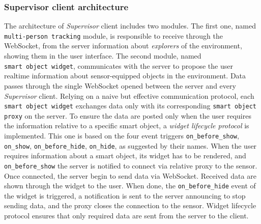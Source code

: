 \subsubsection{Supervisor client architecture}\label{supervisor-client-architecture}

The architecture of \emph{Supervisor} client includes two modules. The first
one, named \texttt{multi-person\ tracking} module, is responsible to
receive through the WebSocket, from the server information about
\emph{explorers} of the environment, showing them in the user interface. The
second module, named \texttt{smart\ object\ widget}, communicates with the
server to propose the user realtime information about sensor-equip\-ped
objects in the environment. Data passes through the single WebSocket
opened between the server and every \emph{Supervisor} client. Relying on a
naive but effective communication protocol, each \texttt{smart object widget}
exchanges data only with its corresponding \texttt{smart object proxy} on the server. To
ensure the data are posted only when the user requires the information
relative to a specific smart object, a \emph{widget lifecycle protocol} is
implemented. This one is based on the four event triggers \texttt{on\_before\_show},
\texttt{on\_show}, \texttt{on\_before\_hide}, \texttt{on\_hide}, as suggested by their names.
When the user requires information about a smart object, its widget has
to be rendered, and \texttt{on\_before\_show} the server is notified to
connect via relative proxy to the sensor. Once connected, the server
begin to send data via WebSocket. Received data are shown through the
widget to the user. When done, the \texttt{on\_before\_hide} event of the
widget is triggered, a notification is sent to the server announcing to stop sending
data, and the proxy closes the connection to the sensor. Widget lifecycle
protocol ensures that only required data are sent from the server to the
client.
